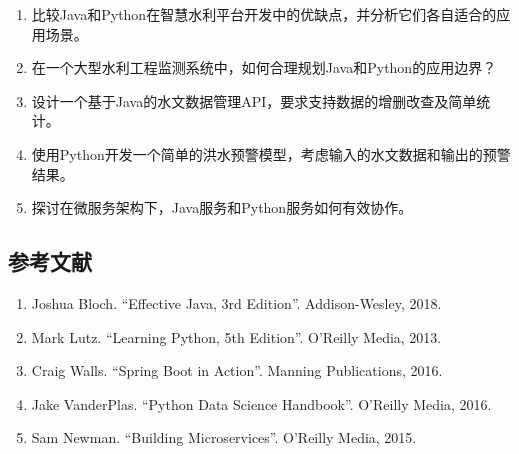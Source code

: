 \begin{enumerate}
\def\labelenumi{\arabic{enumi}.}
\tightlist
\item
  比较Java和Python在智慧水利平台开发中的优缺点，并分析它们各自适合的应用场景。
\item
  在一个大型水利工程监测系统中，如何合理规划Java和Python的应用边界？
\item
  设计一个基于Java的水文数据管理API，要求支持数据的增删改查及简单统计。
\item
  使用Python开发一个简单的洪水预警模型，考虑输入的水文数据和输出的预警结果。
\item
  探讨在微服务架构下，Java服务和Python服务如何有效协作。
\end{enumerate}

\subsection{参考文献}\label{ux53c2ux8003ux6587ux732e}

\begin{enumerate}
\def\labelenumi{\arabic{enumi}.}
\tightlist
\item
  Joshua Bloch. ``Effective Java, 3rd Edition''. Addison-Wesley, 2018.
\item
  Mark Lutz. ``Learning Python, 5th Edition''. O'Reilly Media, 2013.
\item
  Craig Walls. ``Spring Boot in Action''. Manning Publications, 2016.
\item
  Jake VanderPlas. ``Python Data Science Handbook''. O'Reilly Media,
  2016.
\item
  Sam Newman. ``Building Microservices''. O'Reilly Media, 2015.
\end{enumerate}
